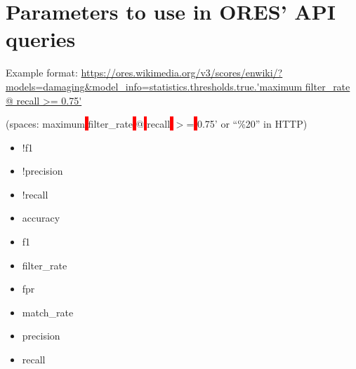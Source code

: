 \documentclass[12pt,a4paper]{article}
\begin{document}
\section*{Parameters to use in ORES' API queries}
Example format: \url{https://ores.wikimedia.org/v3/scores/enwiki/?models=damaging&model_info=statistics.thresholds.true.'maximum filter_rate @ recall >= 0.75'}
\begin{description}
\item (spaces: maximum\colorbox{red}{ }filter\_rate\colorbox{red}{ }@\colorbox{red}{ }recall\colorbox{red}{ }$>$=\colorbox{red}{ }0.75' or ``\%20'' in HTTP)
\end{description}
\begin{itemize}
\item !f1
\item !precision
\item !recall
\item accuracy
\item f1
\item filter\_rate
\item fpr
\item match\_rate
\item precision
\item recall
\end{itemize}
\end{document}
